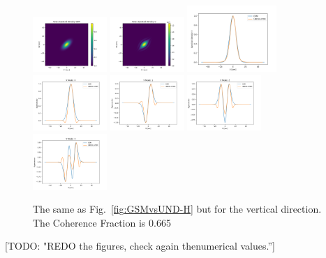 \documentclass{iopconfser}
\newcommand{\todo}[1]{{\color{red}[TODO: "#1'']}}
\begin{document}
\begin{figure}
    \centering
    \includegraphics[width=0.25\textwidth]{figures/comparison_V_CSD_GSM.png}
    \includegraphics[width=0.25\textwidth]{figures/comparison_V_CSD_U.png}
    \newline
    \includegraphics[width=0.3\textwidth]{figures/comparison_V_SD.png}
    \newline
    \includegraphics[width=0.25\textwidth]{figures/comparison_V_eigenvector0.png}
    \includegraphics[width=0.25\textwidth]{figures/comparison_V_eigenvector1.png}
    \includegraphics[width=0.25\textwidth]{figures/comparison_V_eigenvector2.png}
    \includegraphics[width=0.25\textwidth]{figures/comparison_V_eigenvector3.png}
        
    \caption{The same as Fig.~\ref{fig:GSMvsUND-H} but for the vertical direction. The Coherence Fraction is 0.665}
    \label{fig:GSMvsUND-V}
\end{figure}
\todo{REDO the figures, check again thenumerical values.}
\end{document}
